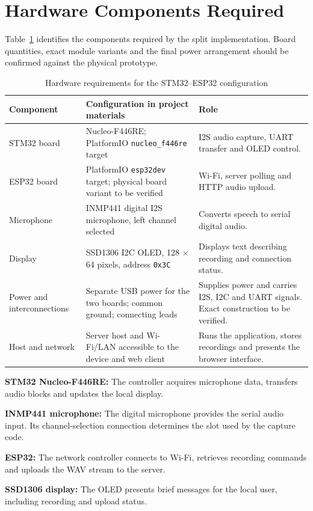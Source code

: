 \documentclass[a4paper,12pt,oneside]{report}
\begin{document}
\section{Hardware Components Required}
Table~\ref{tab:hardware} identifies the components required by the split implementation. Board quantities, exact module variants and the final power arrangement should be confirmed against the physical prototype.
\begin{table}[htbp]
\centering
\caption{Hardware requirements for the STM32--ESP32 configuration}
\label{tab:hardware}
\small
\begin{tabularx}{\textwidth}{@{}lX X@{}}
\toprule
Component & Configuration in project materials & Role \\
\midrule
STM32 board & Nucleo-F446RE; PlatformIO \texttt{nucleo\_f446re} target & I2S audio capture, UART transfer and OLED control. \\
ESP32 board & PlatformIO \texttt{esp32dev} target; physical board variant to be verified & Wi-Fi, server polling and HTTP audio upload. \\
Microphone & INMP441 digital I2S microphone, left channel selected & Converts speech to serial digital audio. \\
Display & SSD1306 I2C OLED, 128 $\times$ 64 pixels, address \texttt{0x3C} & Displays text describing recording and connection status. \\
Power and interconnections & Separate USB power for the two boards; common ground; connecting leads & Supplies power and carries I2S, I2C and UART signals. Exact construction to be verified. \\
Host and network & Server host and Wi-Fi/LAN accessible to the device and web client & Runs the application, stores recordings and presents the browser interface. \\
\bottomrule
\end{tabularx}
\end{table}

\textbf{STM32 Nucleo-F446RE:} The controller acquires microphone data, transfers audio blocks and updates the local display.

\textbf{INMP441 microphone:} The digital microphone provides the serial audio input. Its channel-selection connection determines the slot used by the capture code.

\textbf{ESP32:} The network controller connects to Wi-Fi, retrieves recording commands and uploads the WAV stream to the server.

\textbf{SSD1306 display:} The OLED presents brief messages for the local user, including recording and upload status.
\end{document}
